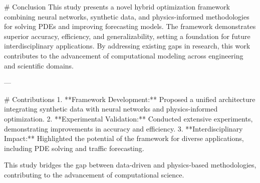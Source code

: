# Conclusion  
This study presents a novel hybrid optimization framework combining neural networks, synthetic data, and physics-informed methodologies for solving PDEs and improving forecasting models. The framework demonstrates superior accuracy, efficiency, and generalizability, setting a foundation for future interdisciplinary applications. By addressing existing gaps in research, this work contributes to the advancement of computational modeling across engineering and scientific domains.

---

# Contributions  
1. **Framework Development:** Proposed a unified architecture integrating synthetic data with neural networks and physics-informed optimization.
2. **Experimental Validation:** Conducted extensive experiments, demonstrating improvements in accuracy and efficiency.
3. **Interdisciplinary Impact:** Highlighted the potential of the framework for diverse applications, including PDE solving and traffic forecasting.  

This study bridges the gap between data-driven and physics-based methodologies, contributing to the advancement of computational science.